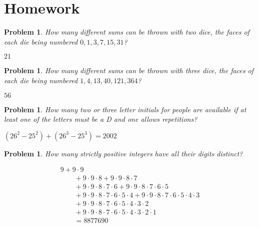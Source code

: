 \documentclass[11pt, openany]{book}
\theoremstyle{change} \theoremheaderfont{\blue\sffamily\bfseries}
\newtheorem{pro}[thm]{Problem}
\theoremstyle{nonumberplain} \theoremheaderfont{\sffamily\bfseries}
\newcommand{\í}{\'{\i}}
\begin{document}
\section*{Homework}
\begin{multicols}{2}\columnseprule 1pt \columnsep 25pt
\begin{pro}
How many different sums can be thrown with two dice, the faces of
each die being numbered $0, 1, 3, 7, 15, 31$?
\begin{answer}$21$
\end{answer}
 \end{pro}
         \begin{pro}
How many different sums can be thrown with three dice, the faces of
each die being numbered $1, 4, 13, 40, 121, 364$?
\begin{answer}$56$
\end{answer}
      \end{pro}
            \begin{pro}
How many two or three letter initials for people are available if at
least one of the letters must be a D and  one allows repetitions?
\begin{answer} $(26^2 - 25^2) + (26^3 - 25^3) = 2002$\end{answer}
\end{pro}         \begin{pro} How many strictly positive integers have all
their digits distinct? \begin{answer}$$\begin{array}{l}9 +
9\cdot 9   \\ \qquad +9\cdot9\cdot 8 +9\cdot9\cdot8\cdot7    \\
\qquad +9\cdot9\cdot8\cdot7\cdot6+9\cdot9\cdot8\cdot7\cdot6\cdot 5
\\  \qquad + 9\cdot9\cdot8\cdot7\cdot6\cdot5\cdot 4
+9\cdot9\cdot8\cdot7\cdot6\cdot5\cdot4\cdot 3    \\ \qquad +
9\cdot9\cdot8\cdot7\cdot6\cdot5\cdot4\cdot3\cdot 2   \\
\qquad + 9\cdot9\cdot8\cdot7\cdot6\cdot5\cdot4\cdot3\cdot2\cdot
1    \\
  \qquad =
8877690
\end{array}
$$


\end{answer}
\end{pro}
\end{multicols}
\end{document}
